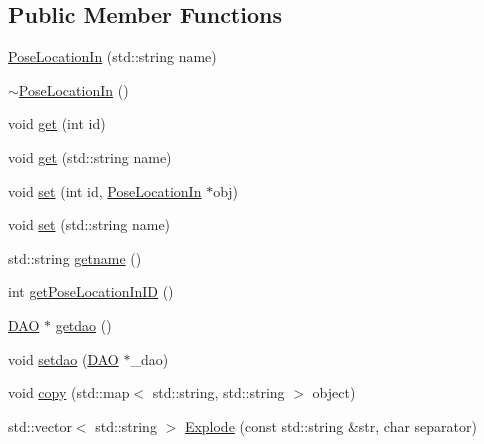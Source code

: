 \subsection*{Public Member Functions}
\begin{DoxyCompactItemize}
\item 
\hyperlink{class_pose_location_in_a1e8dd523e9958f6e3fcdfad8e3c08b50}{PoseLocationIn} (std::string name)
\item 
\hyperlink{class_pose_location_in_a264f03a785e081738435ad6e18af4a1e}{$\sim$PoseLocationIn} ()
\item 
void \hyperlink{class_pose_location_in_a717cd5951630120110887cac063facb3}{get} (int id)
\item 
void \hyperlink{class_pose_location_in_a91d60b119ddf6254472751d0346cba9c}{get} (std::string name)
\item 
void \hyperlink{class_pose_location_in_af9a8ba790c015c10caca45f85bf5302a}{set} (int id, \hyperlink{class_pose_location_in}{PoseLocationIn} $\ast$obj)
\item 
void \hyperlink{class_pose_location_in_a57e44bf1ccaadd0e58277d1d1feebcee}{set} (std::string name)
\item 
std::string \hyperlink{class_pose_location_in_a22fa79ef529f695db02ff986444f976e}{getname} ()
\item 
int \hyperlink{class_pose_location_in_addca95d067dfd8f9217fc55c4aa89165}{getPoseLocationInID} ()
\item 
\hyperlink{class_d_a_o}{DAO} $\ast$ \hyperlink{class_pose_location_in_a91db9c4b46c96f2a443fb08a7738faaa}{getdao} ()
\item 
void \hyperlink{class_pose_location_in_a0ed7e6d3b25f39f6cd6695f2675c595f}{setdao} (\hyperlink{class_d_a_o}{DAO} $\ast$\_\-dao)
\item 
void \hyperlink{class_pose_location_in_a6e22c098d49dd63a910681d7faa1e760}{copy} (std::map$<$ std::string, std::string $>$ object)
\item 
std::vector$<$ std::string $>$ \hyperlink{class_pose_location_in_ac6ee532cb7e7ef8be4efdb83f4454dff}{Explode} (const std::string \&str, char separator)
\end{DoxyCompactItemize}



